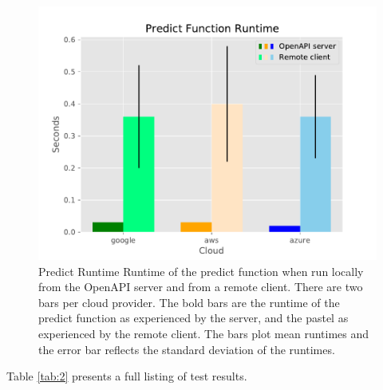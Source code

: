 \begin{figure}
\centering

\includegraphics[width=\columnwidth]{images/sample_graph_4.pdf}

\caption{Predict Runtime Runtime of the predict function when run locally from
the OpenAPI server and from a remote client. There are two bars per
cloud provider. The bold bars are the runtime of the predict function as
experienced by the server, and the pastel as experienced by the remote
client. The bars plot mean runtimes and the error bar reflects the
standard deviation of the runtimes.}
\label{fig:predict}
\end{figure}

Table \ref{tab:2} presents a full listing of test results.



